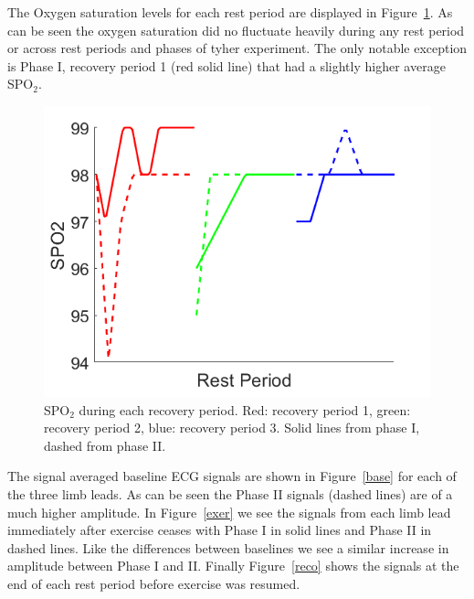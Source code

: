 \documentclass[12pt]{article}
\newcommand{\spo}{{SPO$_2$}}
\begin{document}
The Oxygen saturation levels for each rest period are displayed in Figure~\ref{spo}. As can be seen the oxygen saturation did no fluctuate heavily during any rest period or across rest periods and phases of tyher experiment. The only notable exception is Phase I, recovery period 1 (red solid line) that had a slightly higher average \spo. 

\begin{figure}[H]
	
	\centering
	\includegraphics[width = .8\textwidth]{Figures/spo2.png}
	\caption{\spo{} during each recovery period. Red: recovery period 1, green: recovery period 2, blue: recovery period 3. Solid lines from phase I, dashed from phase II.}
	\label{spo}
\end{figure}

The signal averaged baseline ECG signals are shown in Figure~\ref{base} for each of the three limb leads. As can be seen the Phase II signals (dashed lines) are of a much higher amplitude. In Figure~\ref{exer} we see the signals from each limb lead immediately after exercise ceases with Phase I in solid lines and Phase II in dashed lines. Like the differences between baselines we see a similar increase in amplitude between Phase I and II. Finally Figure~\ref{reco} shows the signals at the end of each rest period before exercise was resumed. 
\end{document}
